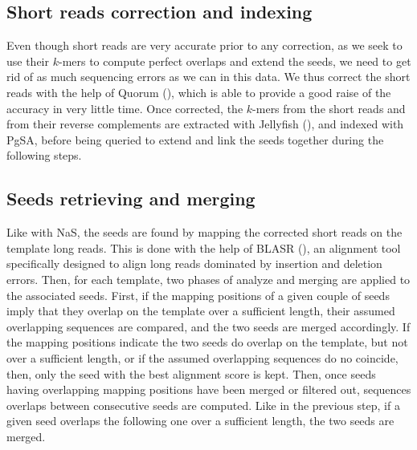 \documentclass{bioinfo}
\begin{document}
\subsection{Short reads correction and indexing}

Even though short reads are very accurate prior to any correction, as we seek to use their $k$-mers to compute perfect overlaps and extend the seeds, we need to get rid of as much sequencing errors as we can in this data. We thus correct the short reads with the help of Quorum (\cite{Marcais2015}), which is able to provide a good raise of the accuracy in very little time. Once corrected, the $k$-mers from the short reads and from their reverse complements are extracted with Jellyfish (\cite{Marcais2011}), and indexed with PgSA, before being queried to extend and link the seeds together during the following steps.

\subsection{Seeds retrieving and merging}

Like with NaS, the seeds are found by mapping the corrected short reads on the template long reads. This is done with the help of BLASR (\cite{Chaisson2012}), an alignment tool specifically designed to align long reads dominated by insertion and deletion errors. Then, for each template, two phases of analyze and merging are applied to the associated seeds. First, if the mapping positions of a given couple of seeds imply that they overlap on the template over a sufficient length, their assumed overlapping sequences are compared, and the two seeds are merged accordingly. If the mapping positions indicate the two seeds do overlap on the template, but not over a sufficient length, or if the assumed overlapping sequences do no coincide, then, only the seed with the best alignment score is kept. Then, once seeds having overlapping mapping positions have been merged or filtered out, sequences overlaps between consecutive seeds are computed. Like in the previous step, if a given seed overlaps the following one over a sufficient length, the two seeds are merged.
\end{document}
